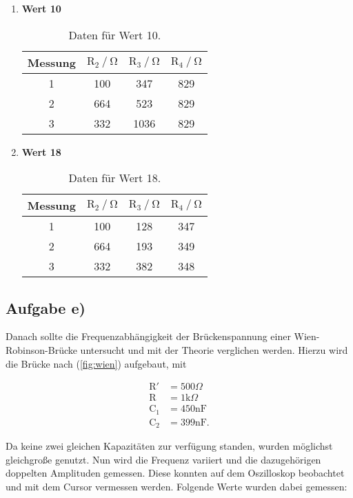 \begin{enumerate}
\item \textbf{Wert 10}

\begin{table}
\centering
\begin{tabular}{c c c c }
\toprule
{Messung} &{$ \text{R}_2 \mathbin{/} \si{\ohm} $} & {$ \text{R}_3 \mathbin{/} \si{\ohm} $} & {$ \text{R}_4 \mathbin{/} \si{\ohm} $} \\
\midrule
1 & 100 & 347 & 829 \\
2 & 664 & 523 & 829 \\
3 & 332 & 1036 & 829 \\
\bottomrule
\end{tabular}
\caption{Daten für Wert 10.}
\label{tab:ad10}
\end{table}



\item \textbf{Wert 18}

\begin{table}
\centering
\begin{tabular}{c c c c }
\toprule
{Messung} & {$ \text{R}_2 \mathbin{/} \si{\ohm} $} & {$ \text{R}_3 \mathbin{/} \si{\ohm} $} & {$ \text{R}_4 \mathbin{/} \si{\ohm} $} \\
\midrule
1 & 100 & 128 & 347 \\
2 & 664 & 193 & 349 \\
3 & 332 & 382 & 348 \\
\bottomrule
\end{tabular}
\caption{Daten für Wert 18.}
\label{tab:ad18}
\end{table}

\end{enumerate}

\subsection{Aufgabe e)}

\noindent
Danach sollte die Frequenzabhängigkeit der Brückenspannung einer Wien-Robinson-Brücke untersucht und mit der Theorie verglichen werden.
Hierzu wird die Brücke nach (\ref{fig:wien}) aufgebaut, mit

\begin{align*}
\text{R}' &= 500\Omega\\
\text{R} &= 1\text{k}\Omega\\
\text{C}_1 &= 450 \si{\nano\farad}\\
\text{C}_2 &= 399 \si{\nano\farad}.
\end{align*}

\noindent
Da keine zwei gleichen Kapazitäten zur verfügung standen, wurden möglichst gleichgroße genutzt.
Nun wird die Frequenz variiert und die dazugehörigen doppelten Amplituden gemessen.
Diese konnten auf dem Oszilloskop beobachtet und mit dem Cursor vermessen werden.
Folgende Werte wurden dabei gemessen:

